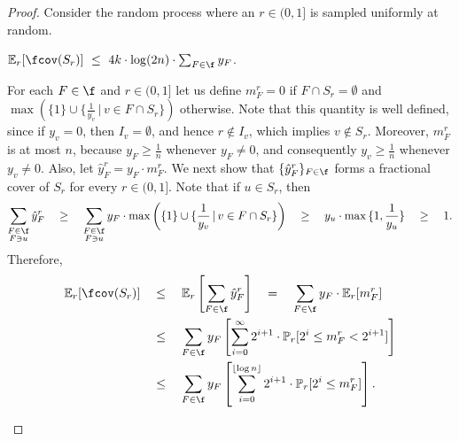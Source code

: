 \begin{proof}
    Consider the random process where an $r\in (0,1]$ is sampled uniformly at random.

    \begin{claim}\label{claim:S_r_has_small_cover}
        $\mathbb{E}_r[\fcov(S_r)]\ \leq\ 4k \cdot \log(2n) \cdot \sum_{F \in \f} y_F$.
    \end{claim}
    
    
    \begin{claimproof}
        For each $F\in\f$ and $r\in(0,1]$ let us define $m^r_F = 0$ if $F \cap S_r = \emptyset$ and $\max\left( \{1\} \cup \{ \frac{1}{y_v} \, |\, v \in F \cap S_r \} \right)$ otherwise. Note that this quantity is well defined, since if $y_v = 0$, then $I_v = \emptyset$, and hence $r \notin I_v$, which implies $v \notin S_r$. Moreover, $m^r_F$ is at most $n$, because $y_F \geq \frac{1}{n}$ whenever $y_F \neq 0$, and consequently $y_v \geq \frac{1}{n}$ whenever $y_v \neq 0$. Also, let $\hat{y}_F^r = y_F \cdot m^r_F$. 
        We next show that $\{\hat{y}_F^r\}_{F \in \f}$ forms a fractional cover of $S_r$ for every $r \in (0, 1]$.
        Note that if $u \in S_r$, then
        $$
        \sum_{\substack{F \in \f\\ F \ni u}} \hat{y}_F^r \quad  
        \geq \quad \sum_{\substack{F \in \f\\ F \ni u}} y_F \cdot \max\left( \{1\} \cup \{ \frac{1}{y_v} \, |\, v \in F \cap S_r \} \right) \quad 
        \geq \quad y_u \cdot \max\, \{1, \frac{1}{y_u}\} \quad 
        \geq \quad 1.
        $$ 
        Therefore, 
        \begin{align}\label{eq:expectaion_A-B_separator}
            \nonumber \mathbb{E}_r[\fcov(S_r)] \quad
            &\leq \quad \mathbb{E}_r\left[\sum_{F \in \f} \hat{y}_F^r\right]\quad = \quad \sum_{F \in \f} y_F \cdot \mathbb{E}_r[m_F^r]\\
            \nonumber &\leq \quad \sum_{F \in \f} y_F \left[ \sum_{i = 0}^{\infty} 2^{i+1} \cdot \mathbb{P}_r[2^i \leq m_F^r < 2^{i+1}] \right]\\
            &\leq \quad \sum_{F \in \f} y_F \left[ \sum_{i = 0}^{\lfloor \log n \rfloor} 2^{i+1} \cdot \mathbb{P}_r[2^i \leq m_F^r] \right].
        \end{align} 
        

\end{claimproof}
\end{proof}
